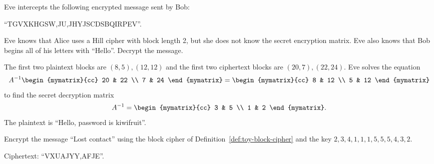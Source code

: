 \begin{enumialphparenastyle}
\begin{ex}
  Eve intercepts the following encrypted message sent by Bob:
  \begin{center}
    ``TGVXKHGSW,JU,JHYJSCDSBQIRPEV''.
  \end{center}
  Eve knows that Alice uses a Hill cipher with block length 2, but she
  does not know the secret encryption matrix. Eve also knows that
  Bob begins all of his letters with ``Hello''. Decrypt the message.
  \begin{sol}
    The first two plaintext blocks are $(8,5),(12,12)$ and the first
    two ciphertext blocks are $(20,7),(22,24)$. Eve solves the equation
    \begin{equation*}
      A^{-1} \begin{mymatrix}{cc} 20 & 22 \\ 7 & 24 \end{mymatrix}
      = \begin{mymatrix}{cc} 8 & 12 \\ 5 & 12 \end{mymatrix}
    \end{equation*}
    to find the secret decryption matrix
    \begin{equation*}
      A^{-1} = \begin{mymatrix}{cc} 3 & 5 \\ 1 & 2 \end{mymatrix}.
    \end{equation*}
    The plaintext is ``Hello, password is kiwifruit''.
  \end{sol}
\end{ex}

\begin{ex}
  Encrypt the message ``Lost contact'' using the block cipher of
  Definition~\ref{def:toy-block-cipher} and the key
  $2,3,4,1,1,1,5,5,5,4,3,2$.
  \begin{sol}
    Ciphertext: ``VXUAJYY,AFJE''.
  \end{sol}
\end{ex}


\end{enumialphparenastyle}
